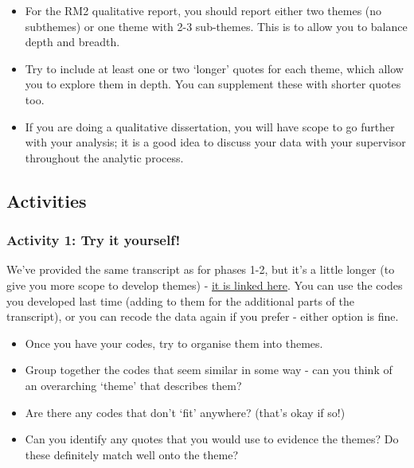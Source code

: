 \documentclass[
  english,
  letterpaper,
  DIV=11,
  numbers=noendperiod]{scrreprt}
\providecommand{\tightlist}{%
  \setlength{\itemsep}{0pt}\setlength{\parskip}{0pt}}
\begin{document}
\begin{tcolorbox}[enhanced jigsaw, breakable, bottomtitle=1mm, leftrule=.75mm, opacityback=0, colbacktitle=quarto-callout-warning-color!10!white, opacitybacktitle=0.6, toprule=.15mm, colback=white, left=2mm, coltitle=black, bottomrule=.15mm, titlerule=0mm, title={Practical Steps}, toptitle=1mm, colframe=quarto-callout-warning-color-frame, arc=.35mm, rightrule=.15mm]

\begin{itemize}
\tightlist
\item
  For the RM2 qualitative report, you should report either two themes
  (no subthemes) or one theme with 2-3 sub-themes. This is to allow you
  to balance depth and breadth.
\item
  Try to include at least one or two `longer' quotes for each theme,
  which allow you to explore them in depth. You can supplement these
  with shorter quotes too.
\item
  If you are doing a qualitative dissertation, you will have scope to go
  further with your analysis; it is a good idea to discuss your data
  with your supervisor throughout the analytic process.
\end{itemize}

\end{tcolorbox}

\subsection{Activities}\label{activities-2}

\subsubsection{Activity 1: Try it
yourself!}\label{activity-1-try-it-yourself}

We've provided the same transcript as for phases 1-2, but it's a little
longer (to give you more scope to develop themes) -
\href{https://gla-my.sharepoint.com/:w:/g/personal/ashley_robertson_glasgow_ac_uk/EZaA8YkYkyVGkwn0cEDFLCABWr5rREIlMAyIaAPHu3juTg?e=QgyPdd}{it
is linked here}. You can use the codes you developed last time (adding
to them for the additional parts of the transcript), or you can recode
the data again if you prefer - either option is fine.

\begin{itemize}
\tightlist
\item
  Once you have your codes, try to organise them into themes.
\item
  Group together the codes that seem similar in some way - can you think
  of an overarching `theme' that describes them?
\item
  Are there any codes that don't `fit' anywhere? (that's okay if so!)
\item
  Can you identify any quotes that you would use to evidence the themes?
  Do these definitely match well onto the theme?
\end{itemize}
\end{document}
